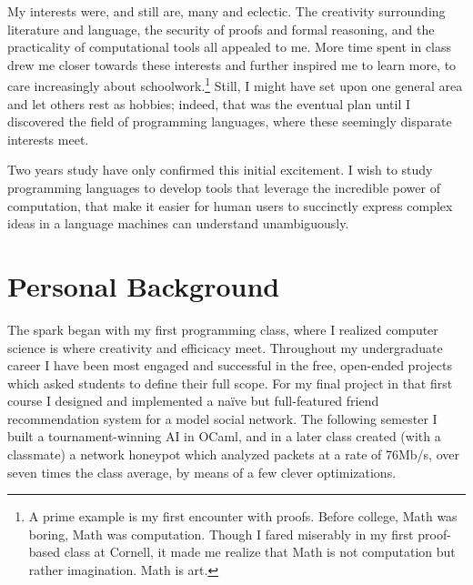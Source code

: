 \documentclass{article}
\begin{document}
My interests were, and still are, many and eclectic.
The creativity surrounding literature and language, the security of proofs and formal reasoning, and the practicality of computational tools all appealed to me. 
More time spent in class drew me closer towards these interests and further inspired me to learn more, to care increasingly about schoolwork.\footnote{A prime example is my first encounter with proofs. Before college, Math was boring, Math was computation. Though I fared miserably in my first proof-based class at Cornell, it made me realize that Math is not computation but rather imagination. Math is art.}
Still, I might have set upon one general area and let others rest as hobbies; indeed, that was the eventual plan until I discovered the field of programming languages, where these seemingly disparate interests meet.

Two years study have only confirmed this initial excitement.
I wish to study programming languages to develop tools that leverage the incredible power of computation, that make it easier for human users to succinctly express complex ideas in a language machines can understand unambiguously.

\section{Personal Background}

The spark began with my first programming class, where I realized computer science is where creativity and efficicacy meet. 
Throughout my undergraduate career I have been most engaged and successful in the free, open-ended projects which asked students to define their full scope.
For my final project in that first course I designed and implemented a na\"ive but full-featured friend recommendation system for a model social network.
The following semester I built a tournament-winning AI in OCaml, and in a later class created (with a classmate) a network honeypot which analyzed packets at a rate of 76Mb/s, over seven times the class average, by means of a few clever optimizations.
\end{document}
